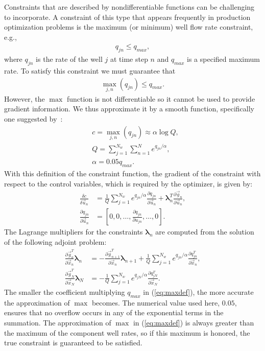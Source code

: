 \documentclass[twocolumn,numbook]{svjour3}          %
\newcommand{\pder}[2]{\frac{\partial #1}{\partial #2}}
\def\u{{\vec u}}
\def\x{{\vec x}}
\def\p{{\vec{g}}}
\def\blambda{{\pmb{\lambda}}}%
\begin{document}
Constraints that are described by nondifferentiable functions can be challenging
to incorporate. A constraint of this type that appears frequently in production
optimization problems is the maximum (or minimum) well flow rate constraint,
e.g.,
%
\begin{align}
q_{jn} \leq q_{max},
\end{align}
%
where $q_{jn}$ is the rate of the well $j$ at time step $n$ and $q_{max}$ is a specified maximum rate.
To satisfy this constraint we must guarantee that
\begin{align}
\max_{j,n}{(q_{jn})} \leq q_{max}.
\end{align}
However, the $\max$ function is not differentiable 
so it cannot be used to provide
gradient information.  We thus approximate it by a smooth
function, specifically one suggested by~\cite{Bertsekas}:
%
\begin{align} \label{eq:maxdef} &c = \max_{j,n}(q_{jn}) \approx \alpha
\log{Q}, \nonumber \\
&Q = \sum_{j=1}^{N_w}\sum_{n=1}^{N} e^{q_{jn}/\alpha}, \\ 
&\alpha = 0.05 q_{max}. \end{align}
%
With this definition of the constraint
function, the gradient of the constraint with respect to the control variables,
  which is required by the optimizer, is given by:
\begin{align} \label{eq:constraintGradient} \frac{\delta c}{\delta \u_n} &=
\frac{1}{Q}\sum_{j=1}^{N_w} e^{q_{jn}/\alpha} \pder{q_{jn}}{\u_n} +\blambda^T_n\pder{\p_n}{\u_n},  
\nonumber \\
\pder{q_{jn}}{\u_{n}} &= \left [ 0, 0, \ldots, \pder{q_{jn}}{u_{jn}}, \ldots, 0 \right ].
\end{align}
%
The Lagrange multipliers for the constraints $\blambda_n$ are
computed from the solution of the following adjoint problem:
  \begin{align}
\label{eq:discreteODEConstraints}
 \pder{\p_n^T}{\x_n}  \blambda_n &= -
\pder{\p_{n+1}^T}{\x_n} \blambda_{n+1} + 
\frac{1}{Q}\sum_{j=1}^{N_w} e^{q_{jn}/\alpha} \pder{q^T_{jn}}{\x_n}, 
\\
\label{eq:discreteBCConstraints}
\pder{\p_N^T}{\x_N} \blambda_N &= -
\frac{1}{Q}\sum_{j=1}^{N_w} e^{q_{jN}/\alpha} \pder{q^T_{jN}}{\x_N}.
\end{align}
The smaller the coefficient multiplying $q_{max}$ in (\ref{eq:maxdef}), the more accurate the
approximation of $\max$ becomes. The numerical value used here, $0.05$, ensures
that no overflow occurs in any of the exponential terms in the summation. The
approximation of $\max$ in (\ref{eq:maxdef}) is always greater than the maximum
of the component well rates, so if this maximum is honored, the true constraint
is guaranteed to be satisfied.
\end{document}
